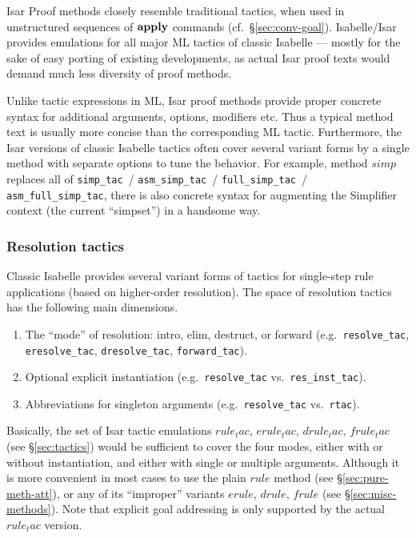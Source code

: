 Isar Proof methods closely resemble traditional tactics, when used in
unstructured sequences of ${\mathord{\mathbf{apply}}}$ commands (cf.\ \S\ref{sec:conv-goal}).
Isabelle/Isar provides emulations for all major ML tactics of classic Isabelle
--- mostly for the sake of easy porting of existing developments, as actual
Isar proof texts would demand much less diversity of proof methods.

Unlike tactic expressions in ML, Isar proof methods provide proper concrete
syntax for additional arguments, options, modifiers etc.  Thus a typical
method text is usually more concise than the corresponding ML tactic.
Furthermore, the Isar versions of classic Isabelle tactics often cover several
variant forms by a single method with separate options to tune the behavior.
For example, method $simp$ replaces all of \texttt{simp_tac}~/
\texttt{asm_simp_tac}~/ \texttt{full_simp_tac}~/ \texttt{asm_full_simp_tac},
there is also concrete syntax for augmenting the Simplifier context (the
current ``simpset'') in a handsome way.


\subsubsection{Resolution tactics}

Classic Isabelle provides several variant forms of tactics for single-step
rule applications (based on higher-order resolution).  The space of resolution
tactics has the following main dimensions.
\begin{enumerate}
\item The ``mode'' of resolution: intro, elim, destruct, or forward (e.g.\ 
  \texttt{resolve_tac}, \texttt{eresolve_tac}, \texttt{dresolve_tac},
  \texttt{forward_tac}).
\item Optional explicit instantiation (e.g.\ \texttt{resolve_tac} vs.\ 
  \texttt{res_inst_tac}).
\item Abbreviations for singleton arguments (e.g.\ \texttt{resolve_tac} vs.\ 
  \texttt{rtac}).
\end{enumerate}

Basically, the set of Isar tactic emulations $rule_tac$, $erule_tac$,
$drule_tac$, $frule_tac$ (see \S\ref{sec:tactics}) would be sufficient to
cover the four modes, either with or without instantiation, and either with
single or multiple arguments.  Although it is more convenient in most cases to
use the plain $rule$ method (see \S\ref{sec:pure-meth-att}), or any of its
``improper'' variants $erule$, $drule$, $frule$ (see
\S\ref{sec:misc-methods}).  Note that explicit goal addressing is only
supported by the actual $rule_tac$ version.

